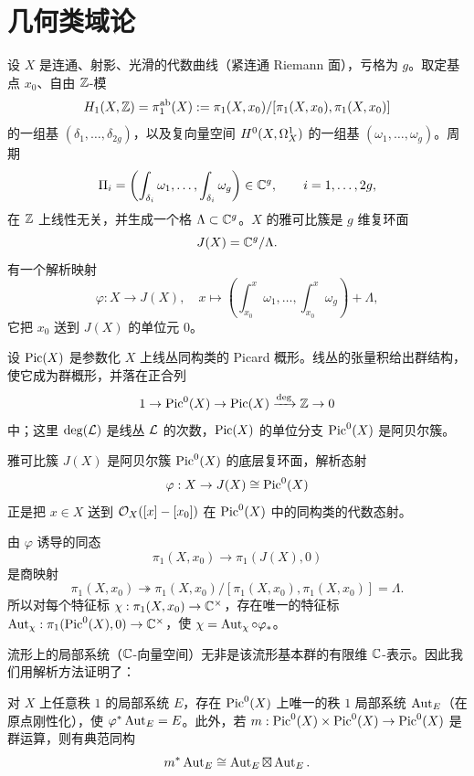 \section{几何类域论}

设 $X$ 是连通、射影、光滑的代数曲线（紧连通 Riemann 面），亏格为 $g$。取定基点 $x_0$、自由 $\mathbb{Z}$-模
\[
  H_1(X,\mathbb{Z})=\pi_1^{\mathrm{ab}}(X):=\pi_1(X,x_0)/[\pi_1(X,x_0),\pi_1(X,x_0)]
\]
的一组基 $(\delta_1,\dots,\delta_{2g})$，以及复向量空间 $H^{0}(X,\Omega^{1}_{X})$ 的一组基 $(\omega_1,\dots,\omega_g)$。周期
\[
  \Pi_i=\left(\int_{\delta_i}\omega_1,\dots,\int_{\delta_i}\omega_g\right)\in\mathbb{C}^{g},
  \qquad i=1,\dots,2g,
\]
在 $\mathbb{Z}$ 上线性无关，并生成一个格 $\Lambda\subset\mathbb{C}^{g}$。$X$ 的雅可比簇是 $g$ 维复环面
\[
  J(X)=\mathbb{C}^{g}/\Lambda.
\]
有一个解析映射
\[
  \varphi:X\to J(X),\quad
  x\mapsto\left(\int_{x_0}^{x}\omega_1,\dots,\int_{x_0}^{x}\omega_g\right)+\Lambda,
\]
它把 $x_0$ 送到 $J(X)$ 的单位元 $0$。

设 $\operatorname{Pic}(X)$ 是参数化 $X$ 上线丛同构类的 Picard 概形。线丛的张量积给出群结构，使它成为群概形，并落在正合列
\[
  1\to\operatorname{Pic}^{0}(X)\to\operatorname{Pic}(X)\xrightarrow{\deg}\mathbb{Z}\to 0
\]
中；这里 $\deg(\mathcal{L})$ 是线丛 $\mathcal{L}$ 的次数，$\operatorname{Pic}(X)$ 的单位分支 $\operatorname{Pic}^{0}(X)$ 是阿贝尔簇。

\begin{theorem}
雅可比簇 $J(X)$ 是阿贝尔簇 $\operatorname{Pic}^{0}(X)$ 的底层复环面，解析态射
\[
  \varphi:X\to J(X)\cong\operatorname{Pic}^{0}(X)
\]
正是把 $x\in X$ 送到 $\mathcal{O}_X([x]-[x_0])$ 在 $\operatorname{Pic}^{0}(X)$ 中的同构类的代数态射。
\end{theorem}

由 $\varphi$ 诱导的同态
\[
  \pi_1(X,x_0)\to\pi_1(J(X),0)
\]
是商映射
\[
  \pi_1(X,x_0)\twoheadrightarrow
  \pi_1(X,x_0)/[\pi_1(X,x_0),\pi_1(X,x_0)]=\Lambda.
\]
所以对每个特征标 $\chi:\pi_1(X,x_0)\to\mathbb{C}^{\times}$，存在唯一的特征标
$\operatorname{Aut}_{\chi}:\pi_1(\operatorname{Pic}^{0}(X),0)\to\mathbb{C}^{\times}$，使 $\chi=\operatorname{Aut}_{\chi}\circ\varphi_{*}$。

流形上的局部系统（$\mathbb{C}$-向量空间）无非是该流形基本群的有限维 $\mathbb{C}$-表示。因此我们用解析方法证明了：

\begin{theorem}
对 $X$ 上任意秩 $1$ 的局部系统 $E$，存在 $\operatorname{Pic}^{0}(X)$ 上唯一的秩 $1$ 局部系统 $\operatorname{Aut}_E$（在原点刚性化），使 $\varphi^{*}\operatorname{Aut}_E=E$。此外，若 $m:\operatorname{Pic}^{0}(X)\times\operatorname{Pic}^{0}(X)\to\operatorname{Pic}^{0}(X)$ 是群运算，则有典范同构
\[
  m^{*}\operatorname{Aut}_E\cong\operatorname{Aut}_E\boxtimes\operatorname{Aut}_E.
\]
\end{theorem}

